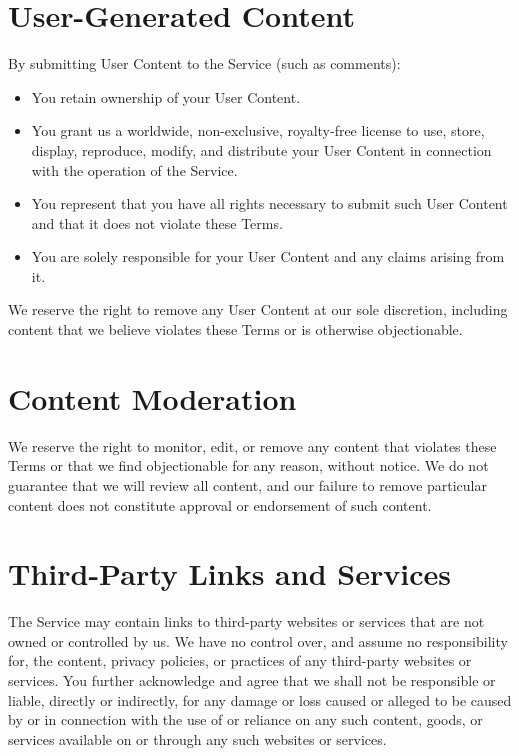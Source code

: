 \documentclass[11pt]{article}
\begin{document}
\section{User-Generated Content}
By submitting User Content to the Service (such as comments):
\begin{itemize}
  \item You retain ownership of your User Content.
  \item You grant us a worldwide, non-exclusive, royalty-free license to use, store, display, reproduce, modify, and distribute your User Content in connection with the operation of the Service.
  \item You represent that you have all rights necessary to submit such User Content and that it does not violate these Terms.
  \item You are solely responsible for your User Content and any claims arising from it.
\end{itemize}

We reserve the right to remove any User Content at our sole discretion, including content that we believe violates these Terms or is otherwise objectionable.

\section{Content Moderation}
We reserve the right to monitor, edit, or remove any content that violates these Terms or that we find objectionable for any reason, without notice. We do not guarantee that we will review all content, and our failure to remove particular content does not constitute approval or endorsement of such content.

\section{Third-Party Links and Services}
The Service may contain links to third-party websites or services that are not owned or controlled by us. We have no control over, and assume no responsibility for, the content, privacy policies, or practices of any third-party websites or services. You further acknowledge and agree that we shall not be responsible or liable, directly or indirectly, for any damage or loss caused or alleged to be caused by or in connection with the use of or reliance on any such content, goods, or services available on or through any such websites or services.
\end{document}
